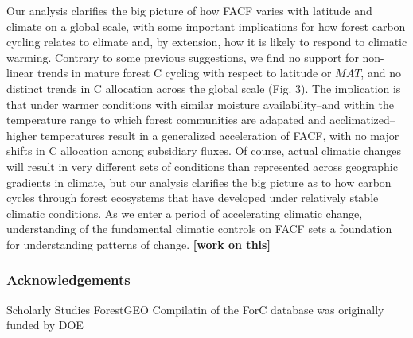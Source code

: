 \documentclass[]{article}
\begin{document}
Our analysis clarifies the big picture of how FACF varies with latitude
and climate on a global scale, with some important implications for how
forest carbon cycling relates to climate and, by extension, how it is
likely to respond to climatic warming. Contrary to some previous
suggestions, we find no support for non-linear trends in mature forest C
cycling with respect to latitude or \(MAT\), and no distinct trends in C
allocation across the global scale (Fig. 3). The implication is that
under warmer conditions with similar moisture availability--and within
the temperature range to which forest communities are adapated and
acclimatized--higher temperatures result in a generalized acceleration
of FACF, with no major shifts in C allocation among subsidiary fluxes.
Of course, actual climatic changes will result in very different sets of
conditions than represented across geographic gradients in climate, but
our analysis clarifies the big picture as to how carbon cycles through
forest ecosystems that have developed under relatively stable climatic
conditions. As we enter a period of accelerating climatic change,
understanding of the fundamental climatic controls on FACF sets a
foundation for understanding patterns of change. \textbf{{[}work on
this{]}}

\subsubsection{Acknowledgements}\label{acknowledgements}

Scholarly Studies ForestGEO Compilatin of the ForC database was
originally funded by DOE


\end{document}
